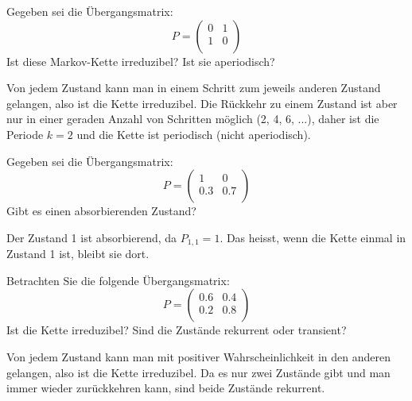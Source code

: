 \begin{mychallenge}[Irreduzibilität]
    Gegeben sei die Übergangsmatrix:
    \[
        P = \begin{pmatrix}
            0 & 1 \\
            1 & 0 \\
        \end{pmatrix}
    \]
    Ist diese Markov-Kette irreduzibel? Ist sie aperiodisch?

    \begin{myanswer}
        Von jedem Zustand kann man in einem Schritt zum jeweils anderen Zustand gelangen, also ist die Kette irreduzibel. Die Rückkehr zu einem Zustand ist aber nur in einer geraden Anzahl von Schritten möglich (2, 4, 6, ...), daher ist die Periode $k=2$ und die Kette ist periodisch (nicht aperiodisch).
    \end{myanswer}
\end{mychallenge}

\begin{mychallenge}
    Gegeben sei die Übergangsmatrix:
    \[
        P = \begin{pmatrix}
            1    & 0    \\
            0.3 & 0.7 \\
        \end{pmatrix}
    \]
    Gibt es einen absorbierenden Zustand?

    \begin{myanswer}
        Der Zustand 1 ist absorbierend, da $P_{1,1} = 1$. Das heisst, wenn die Kette einmal in Zustand 1 ist, bleibt sie dort.
    \end{myanswer}
\end{mychallenge}

\begin{mychallenge}
    Betrachten Sie die folgende Übergangsmatrix:
    \[
        P = \begin{pmatrix}
            0.6 & 0.4 \\
            0.2  & 0.8 \\
        \end{pmatrix}
    \]
    Ist die Kette irreduzibel? Sind die Zustände rekurrent oder transient?

    \begin{myanswer}
        Von jedem Zustand kann man mit positiver Wahrscheinlichkeit in den anderen gelangen, also ist die Kette irreduzibel. Da es nur zwei Zustände gibt und man immer wieder zurückkehren kann, sind beide Zustände rekurrent.
    \end{myanswer}
\end{mychallenge}

